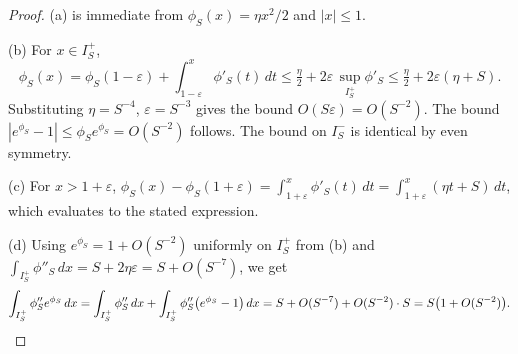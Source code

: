 \begin{proof}
(a) is immediate from $\phi_S(x)=\eta x^2/2$ and $|x|\le 1$.

(b) For $x\in I_S^+$,
\[
  \phi_S(x)=\phi_S(1-\varepsilon)+\int_{1-\varepsilon}^x\phi'_S(t)\,dt
  \le \tfrac{\eta}{2}+2\varepsilon\,\sup_{I_S^+}\phi'_S
  \le \tfrac{\eta}{2}+2\varepsilon(\eta+S).
\]
Substituting $\eta=S^{-4}$, $\varepsilon=S^{-3}$ gives the bound
$O(S\varepsilon)=O(S^{-2})$. The bound $|e^{\phi_S}-1|\le \phi_S e^{\phi_S}
=O(S^{-2})$ follows. The bound on $I_S^-$ is identical by even symmetry.

(c) For $x>1+\varepsilon$, $\phi_S(x)-\phi_S(1+\varepsilon)
=\int_{1+\varepsilon}^x\phi'_S(t)\,dt=\int_{1+\varepsilon}^x(\eta t+S)\,dt$,
which evaluates to the stated expression.

(d) Using $e^{\phi_S}=1+O(S^{-2})$ uniformly on $I_S^+$ from (b) and
$\int_{I_S^+}\phi''_S\,dx=S+2\eta\varepsilon=S+O(S^{-7})$, we get
\[
  \int_{I_S^+}\phi''_S e^{\phi_S}\,dx
  =\int_{I_S^+}\phi''_S\,dx+\int_{I_S^+}\phi''_S\bigl(e^{\phi_S}-1\bigr)\,dx
  = S+O(S^{-7})+O(S^{-2})\cdot S
  = S\bigl(1+O(S^{-2})\bigr).\qedhere
\]
\end{proof}
